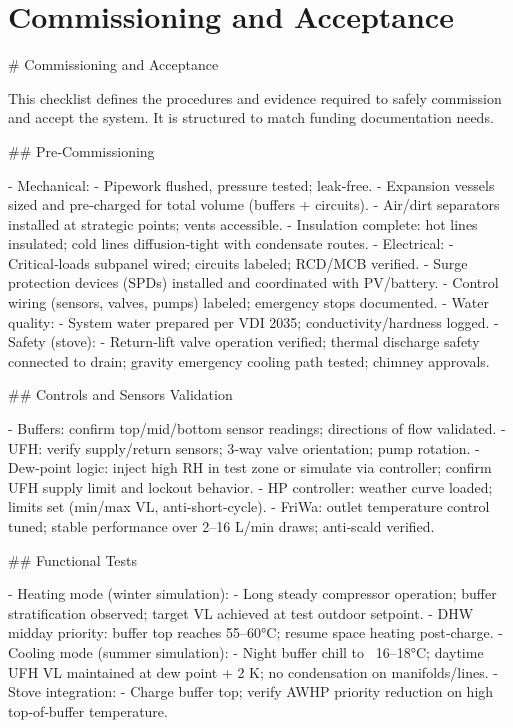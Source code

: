 \documentclass[11pt,oneside]{report}
\begin{document}
\chapter{Commissioning and Acceptance}
\begin{markdown}
# Commissioning and Acceptance

This checklist defines the procedures and evidence required to safely commission and accept the system. It is structured to match funding documentation needs.

## Pre‑Commissioning

- Mechanical:
  - Pipework flushed, pressure tested; leak‑free.
  - Expansion vessels sized and pre‑charged for total volume (buffers + circuits).
  - Air/dirt separators installed at strategic points; vents accessible.
  - Insulation complete: hot lines insulated; cold lines diffusion‑tight with condensate routes.
- Electrical:
  - Critical‑loads subpanel wired; circuits labeled; RCD/MCB verified.
  - Surge protection devices (SPDs) installed and coordinated with PV/battery.
  - Control wiring (sensors, valves, pumps) labeled; emergency stops documented.
- Water quality:
  - System water prepared per VDI 2035; conductivity/hardness logged.
- Safety (stove):
  - Return‑lift valve operation verified; thermal discharge safety connected to drain; gravity emergency cooling path tested; chimney approvals.

## Controls and Sensors Validation

- Buffers: confirm top/mid/bottom sensor readings; directions of flow validated.
- UFH: verify supply/return sensors; 3‑way valve orientation; pump rotation.
- Dew‑point logic: inject high RH in test zone or simulate via controller; confirm UFH supply limit and lockout behavior.
- HP controller: weather curve loaded; limits set (min/max VL, anti‑short‑cycle).
- FriWa: outlet temperature control tuned; stable performance over 2–16 L/min draws; anti‑scald verified.

## Functional Tests

- Heating mode (winter simulation):
  - Long steady compressor operation; buffer stratification observed; target VL achieved at test outdoor setpoint.
  - DHW midday priority: buffer top reaches 55–60°C; resume space heating post‑charge.
- Cooling mode (summer simulation):
  - Night buffer chill to ~16–18°C; daytime UFH VL maintained at dew point + 2 K; no condensation on manifolds/lines.
- Stove integration:
  - Charge buffer top; verify AWHP priority reduction on high top‑of‑buffer temperature.


\end{markdown}
\end{document}

